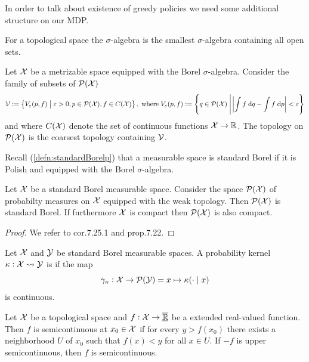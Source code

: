 In order to talk about existence of greedy policies we need some additional
structure on our MDP.

\begin{defn}
  For a topological space the  $\sigma$-algebra is the smallest
  $\sigma$-algebra containing all open sets.
\end{defn}

\begin{defn}
  Let $\mathcal{X}$ be a metrizable space equipped with the Borel $\sigma$-algebra.
  Consider the family of subsets of $\mathcal{P}(\mathcal{X})$
  \[ \mathcal{V} \vcentcolon= \left\{ V_\varepsilon(p, f) \;\middle\vert\; \varepsilon > 0, p \in \mathcal{P}(\mathcal{X}),
    f \in C(\mathcal{X}) \right\}, \; \mathrm{where} \;
    V_\varepsilon(p, f) \vcentcolon= \left\{ q \in \mathcal{P}(\mathcal{X}) \;\middle\vert\;
  \abs{\int f \; \mathrm{d} q - \int f \; \mathrm{d} p} < \varepsilon \right\} \]
  and where $C(\mathcal{X})$ denote the set of continuous functions $\mathcal{X} \to \mathbb{R}$.
  The  topology on $\mathcal{P}(\mathcal{X})$ is the coarsest topology
  containing $\mathcal{V}$.
\end{defn}

Recall (\cref{defn:standardBorelp}) that a measurable space is
standard Borel if it is Polish and equipped with the Borel $\sigma$-algebra.

\begin{prop}
  Let $\mathcal{X}$ be a standard Borel measurable space.
  Consider the space $\mathcal{P}(\mathcal{X})$ of probabilty measures on $\mathcal{X}$
  equipped with the weak topology.
  Then $\mathcal{P}(\mathcal{X})$ is standard Borel.
  If furthermore $\mathcal{X}$ is compact then $\mathcal{P}(\mathcal{X})$ is also compact.
\end{prop}
\begin{proof}
  We refer to  cor.7.25.1 and prop.7.22.
\end{proof}

\begin{defn}
  Let $\mathcal{X}$ and $\mathcal{Y}$ be standard Borel measurable spaces.
  A probability kernel $\kappa : \mathcal{X} \leadsto \mathcal{Y}$ is
   if the map
  \[ \gamma_\kappa : \mathcal{X} \to \mathcal{P}(\mathcal{Y})
  = x \mapsto \kappa(\cdot \mid x) \]
  is continuous.
\end{defn}

\begin{defn}[Semicontinuity]
  Let $\mathcal{X}$ be a topological space and $f : \mathcal{X} \to \overline{\underline{\mathbb{R}}}$ be a
  extended real-valued function.
  Then $f$ is  semicontinuous
  at $x_0 \in \mathcal{X}$ if for every $y > f(x_0)$ there exists a neighborhood
  $U$ of $x_0$ such that $f(x) < y$ for all $x \in U$.
  If $-f$ is upper semicontinuous, then $f$ is  semicontinuous.
\end{defn}

